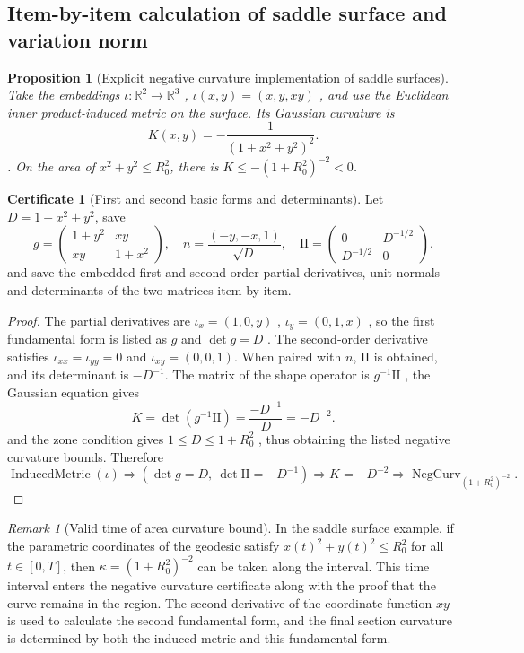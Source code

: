 \documentclass[12pt,a4paper,openany,notitlepage]{report}
\theoremstyle{plain}
\newtheorem{proposition}[theorem]{Proposition}
\theoremstyle{definition}
\newtheorem*{certificate}{Certificate}
\theoremstyle{remark}
\newtheorem{remark}[theorem]{Remark}
\begin{document}
\begin{CJK*}
\section { Item-by-item calculation of saddle surface and variation norm }\label{hgov:geo:observation}


\begin{proposition}
[Explicit negative curvature implementation of saddle surfaces]\label{hgov:geo:prop:saddle}
Take the embeddings $\iota:\mathbb R^2\to\mathbb R^3$ , $\iota(x,y)=(x,y,xy)$ , and use the Euclidean inner product-induced metric on the surface. Its Gaussian curvature is \[
K(x,y)=-\frac{1}{(1+x^2+y^2)^2}.
\]. On the area of $x^2+y^2\le R_0^2$, there is $K\le-(1+R_0^2)^{-2}<0$.\end{proposition}
\begin{certificate}
[First and second basic forms and determinants]Let $D=1+x^2+y^2$, save \[
g=\begin{pmatrix}1+y^2&xy\\xy&1+x^2\end{pmatrix},
\quad
n=\frac{(-y,-x,1)}{\sqrt D},
\quad
\mathrm{II}=\begin{pmatrix}0&D^{-1/2}\\D^{-1/2}&0\end{pmatrix}.
\] and save the embedded first and second order partial derivatives, unit normals and determinants of the two matrices item by item.\end{certificate}
\begin{proof}
The partial derivatives are $\iota_x=(1,0,y)$ , $\iota_y=(0,1,x)$ , so the first fundamental form is listed as $g$ and $\det g=D$ . The second-order derivative satisfies $\iota_{xx}=\iota_{yy}=0$ and $\iota_{xy}=(0,0,1)$. When paired with $n$, $\mathrm{II}$ is obtained, and its determinant is $-D^{-1}$. The matrix of the shape operator is $g^{-1}\mathrm{II}$ , the Gaussian equation gives \[
K=\det(g^{-1}\mathrm{II})
=\frac{-D^{-1}}{D}=-D^{-2}.
\] and the zone condition gives $1\le D\le1+R_0^2$ , thus obtaining the listed negative curvature bounds. Therefore \[
\operatorname{InducedMetric}(\iota)
\Rightarrow(\det g=D,\ \det\mathrm{II}=-D^{-1})
\Rightarrow K=-D^{-2}
\Rightarrow\operatorname{NegCurv}_{(1+R_0^2)^{-2}} .
\]\end{proof}


\begin{remark}
[Valid time of area curvature bound]In the saddle surface example, if the parametric coordinates of the geodesic satisfy $x(t)^2+y(t)^2\le R_0^2$ for all $t\in[0,T]$, then $\kappa=(1+R_0^2)^{-2}$ can be taken along the interval. This time interval enters the negative curvature certificate along with the proof that the curve remains in the region. The second derivative of the coordinate function $xy$ is used to calculate the second fundamental form, and the final section curvature is determined by both the induced metric and this fundamental form.\end{remark}



\end{CJK*}
\end{document}
